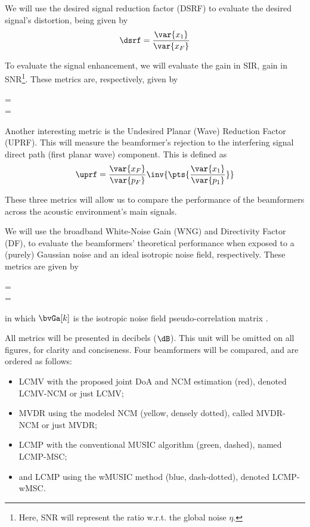 We will use the desired signal reduction factor (DSRF) to evaluate the desired signal's distortion, being given by
\begin{equation}
	\dsrf = \frac{\var{x_1}}{\var{x_F}}
\end{equation}

To evaluate the signal enhancement, we will evaluate the gain in SIR, gain in SNR\footnote{Here, SNR will represent the ratio w.r.t. the global noise $\eta$.}. These metrics are, respectively, given by
\begin{subgather}
	\gsnr =   \\
	\gsir =  
\end{subgather}

Another interesting metric is the Undesired Planar (Wave) Reduction Factor (UPRF). This will measure the beamformer's rejection to the interfering signal direct path (first planar wave) component. This is defined as
\begin{equation}
	\uprf = \frac{\var{x_F}}{\var{p_F}} \inv{\pts{\frac{\var{x_1}}{\var{p_1}}}}
\end{equation}

These three metrics will allow us to compare the performance of the beamformers across the acoustic environment's main signals.

We will use the broadband White-Noise Gain (WNG) and Directivity Factor (DF), to evaluate the beamformers' theoretical performance when exposed to a (purely) Gaussian noise and an ideal isotropic noise field, respectively. These metrics are given by
\begin{subgather}
	\df =  \\
	\wng = 
\end{subgather}
in which $\bvGa[k]$ is the isotropic noise field pseudo-correlation matrix \cite{habets_generating_2007}.

All metrics will be presented in decibels ($\dB$). This unit will be omitted on all figures, for clarity and conciseness. Four beamformers will be compared, and are ordered as follows:
\begin{itemize}
	\item LCMV with the proposed joint DoA and NCM estimation (red), denoted LCMV-NCM or just LCMV;
	\item MVDR using the modeled NCM (yellow, densely dotted), called MVDR-NCM or just MVDR;
	\item LCMP with the conventional MUSIC algorithm (green, dashed), named LCMP-MSC;
	\item and LCMP using the wMUSIC method (blue, dash-dotted), denoted LCMP-wMSC.
\end{itemize} 


